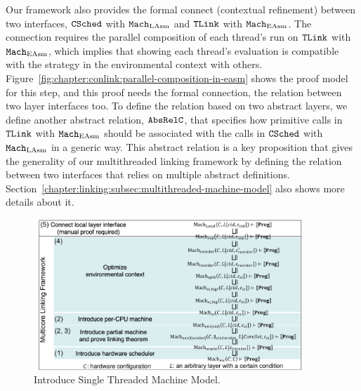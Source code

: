 Our framework also provides 
the formal connect (contextual refinement) between two interfaces, 
${{\mathrm{\texttt{CSched}}}}$ with ${\mathrm{\texttt{Mach}}}_{\mathrm{LAsm}}$ and ${{\mathrm{\texttt{TLink}}}}$ with ${\mathrm{\texttt{Mach}}}_{\mathrm{EAsm}}$.
The connection requires the parallel composition of each thread's run on ${{\mathrm{\texttt{TLink}}}}$ with ${\mathrm{\texttt{Mach}}}_{\mathrm{EAsm}}$,
which implies that showing each thread's evaluation is compatible with the strategy in the environmental context with others.
Figure~\ref{fig:chapter:conlink:parallel-composition-in-easm} shows the proof model for this step, 
and this proof needs the formal connection, the relation between two layer interfaces too. 
To define the relation based on two abstract layers, 
we define another abstract relation, ${{\mathrm{\texttt{AbsRelC}}}}$,
that specifies how primitive calls in ${{\mathrm{\texttt{TLink}}}}$ with ${\mathrm{\texttt{Mach}}}_{\mathrm{EAsm}}$ 
should be associated with the calls in ${{\mathrm{\texttt{CSched}}}}$ with ${\mathrm{\texttt{Mach}}}_{\mathrm{LAsm}}$ in a generic way. 
This abstract relation is a key proposition that gives the generality of our multithreaded linking framework by defining the relation between two interfaces that relies on multiple abstract definitions. 
Section~\ref{chapter:linking:subsec:multithreaded-machine-model} also shows more details about it. 


\begin{figure}
\begin{center}
\includegraphics[width=0.9\textwidth, page=7]{figs/conlink/concurrent_linking}
\end{center}
\caption{Introduce Single Threaded Machine Model.}
\label{fig:chapter:conlink:introduce-single-threaded-machine-model-with-iiasm}
\end{figure}

